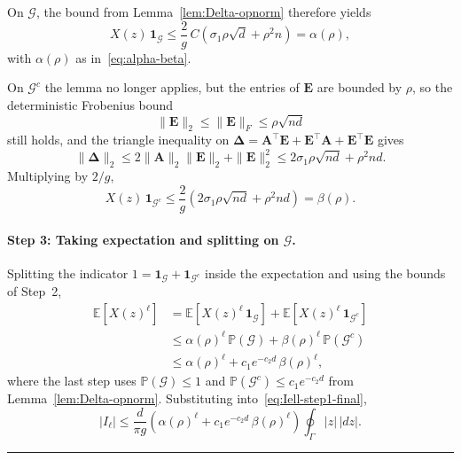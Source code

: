 \documentclass{article}
\newcommand{\twonorm}[1]{\|#1\|_2}
\newcommand{\Ex}[1]{\mbox{}\mathbb{E}\left[#1\right]}
\newcommand{\pr}[1]{\mbox{}\mathbb{P}\left(#1\right)}
\newcommand{\ts}{\top}
\newcommand{\Ab}{\mathbf{A}}
\newcommand{\Eb}{\mathbf{E}}
\newcommand{\Gcal}{\mathcal{G}}
\newcommand{\BlackBox}{\rule{1.5ex}{1.5ex}}  %
\newenvironment{proof}{\par\noindent{\bf Proof\ }}{\hfill\BlackBox\par\medskip}
\newcommand{\rbr}[1]{\left(#1\right)}
\newcommand{\abr}[1]{\left|#1\right|}
\newcommand{\Deltab}{\boldsymbol{\Delta}}
\begin{document}
\begin{proof}
On $\Gcal$, the bound from Lemma~\ref{lem:Delta-opnorm} therefore yields
\begin{equation*}
    X(z)\,\mathbf{1}_{\Gcal} \le \frac{2}{g}\,C\rbr{\sigma_1\rho\sqrt d+\rho^2 n} = \alpha(\rho),
\end{equation*}
with $\alpha(\rho)$ as in~\eqref{eq:alpha-beta}. 

On $\Gcal^c$ the lemma no longer applies, but the entries of $\Eb$ are bounded by $\rho$, so the deterministic Frobenius bound
\begin{equation*}
    \twonorm{\Eb}\le \|\Eb\|_F \le \rho\sqrt{nd}
\end{equation*}
still holds, and the triangle inequality on $\Deltab=\Ab^\ts\Eb+\Eb^\ts\Ab+\Eb^\ts\Eb$ gives
\begin{equation*}
    \twonorm{\Deltab} \le 2\twonorm{\Ab}\twonorm{\Eb}+\twonorm{\Eb}^2 \le 2\sigma_1\rho\sqrt{nd}+\rho^2 nd.
\end{equation*}
Multiplying by $2/g$,
\begin{equation*}
    X(z)\,\mathbf{1}_{\Gcal^c} \le \frac{2}{g}\rbr{2\sigma_1\rho\sqrt{nd}+\rho^2 nd} = \beta(\rho).
\end{equation*}

\paragraph{Step 3: Taking expectation and splitting on $\Gcal$.}
Splitting the indicator $1=\mathbf{1}_{\Gcal}+\mathbf{1}_{\Gcal^c}$ inside the expectation and using the bounds of Step~2,
\begin{align*}
    \Ex{X(z)^\ell} 
    &= \Ex{X(z)^\ell\,\mathbf{1}_{\Gcal}} + \Ex{X(z)^\ell\,\mathbf{1}_{\Gcal^c}} \\
    &\le \alpha(\rho)^\ell\,\pr{\Gcal} + \beta(\rho)^\ell\,\pr{\Gcal^c} \\
    &\le \alpha(\rho)^\ell + c_1 e^{-c_2 d}\,\beta(\rho)^\ell,
\end{align*}
where the last step uses $\pr{\Gcal}\le 1$ and $\pr{\Gcal^c}\le c_1 e^{-c_2 d}$ from Lemma~\ref{lem:Delta-opnorm}. Substituting into~\eqref{eq:Iell-step1-final},
\begin{equation*}
    \abr{I_\ell} \le \frac{d}{\pi g}\rbr{\alpha(\rho)^\ell+c_1 e^{-c_2 d}\,\beta(\rho)^\ell}\oint_\Gamma\abr{z}\,\abr{dz}.
\end{equation*}


\end{proof}
\end{document}
